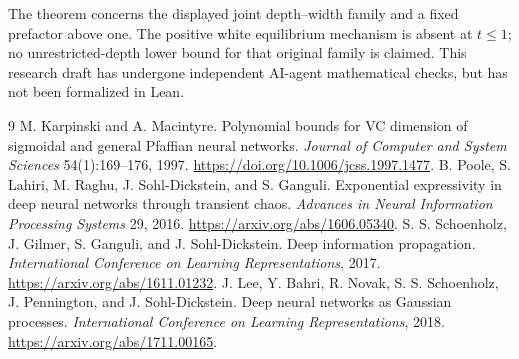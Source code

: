 \documentclass[11pt]{article}
\begin{document}
The theorem concerns the displayed joint depth--width family and a fixed prefactor above one. The positive white equilibrium mechanism is absent at $t\le1$; no unrestricted-depth lower bound for that original family is claimed. This research draft has undergone independent AI-agent mathematical checks, but has not been formalized in Lean.

\begin{thebibliography}{9}
 M. Karpinski and A. Macintyre. Polynomial bounds for VC dimension of sigmoidal and general Pfaffian neural networks. \emph{Journal of Computer and System Sciences} 54(1):169--176, 1997. \url{https://doi.org/10.1006/jcss.1997.1477}.
 B. Poole, S. Lahiri, M. Raghu, J. Sohl-Dickstein, and S. Ganguli. Exponential expressivity in deep neural networks through transient chaos. \emph{Advances in Neural Information Processing Systems} 29, 2016. \url{https://arxiv.org/abs/1606.05340}.
 S. S. Schoenholz, J. Gilmer, S. Ganguli, and J. Sohl-Dickstein. Deep information propagation. \emph{International Conference on Learning Representations}, 2017. \url{https://arxiv.org/abs/1611.01232}.
 J. Lee, Y. Bahri, R. Novak, S. S. Schoenholz, J. Pennington, and J. Sohl-Dickstein. Deep neural networks as Gaussian processes. \emph{International Conference on Learning Representations}, 2018. \url{https://arxiv.org/abs/1711.00165}.
\end{thebibliography}
\end{document}
